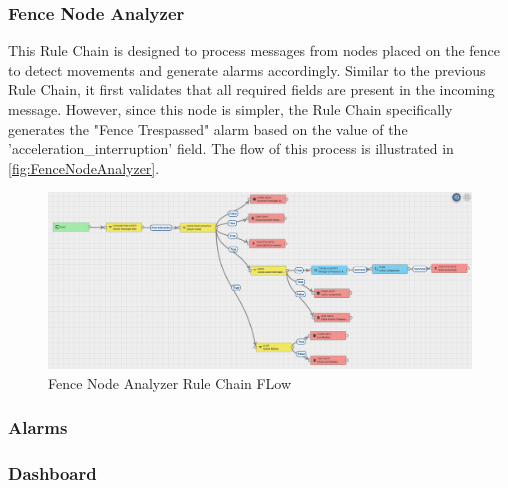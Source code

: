 \subsubsection*{Fence Node Analyzer}
This Rule Chain is designed to process messages from nodes placed on the fence to detect movements and generate alarms accordingly.  
Similar to the previous Rule Chain, it first validates that all required fields are present in the incoming message. However, since this node is simpler, the Rule 
Chain specifically generates the "Fence Trespassed" alarm based on the value of the 'acceleration\_interruption' field. The flow of this process is illustrated in \autoref{fig:FenceNodeAnalyzer}.

\begin{figure}[H]
    \centering
    \includegraphics[width=1\textwidth]{./images/8/FenceNodeAnalyzer.PNG}
    \caption{Fence Node Analyzer Rule Chain FLow}
    \label{fig:FenceNodeAnalyzer}
\end{figure}

\subsubsection*{Alarms}

\subsubsection*{Dashboard}